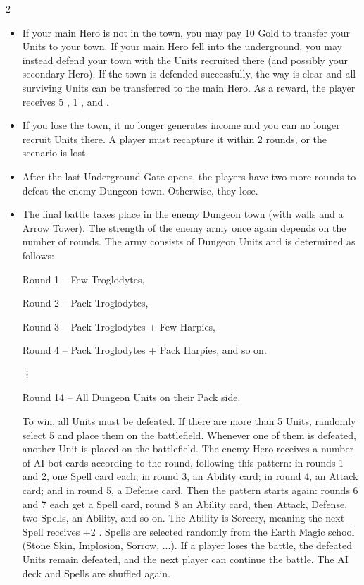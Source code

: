 \begin{multicols*}{2}
\begin{itemize}
\item If your main Hero is not in the town, you may pay 10 Gold to transfer your Units to your town. If your main Hero fell into the underground, you may instead defend your town with the Units recruited there (and possibly your secondary Hero). If the town is defended successfully, the way is clear and all surviving Units can be transferred to the main Hero. As a reward, the player receives 5 , 1 , and .
\item If you lose the town, it no longer generates income and you can no longer recruit Units there. A player must recapture it within 2 rounds, or the scenario is lost.
\item After the last Underground Gate opens, the players have two more rounds to defeat the enemy Dungeon town. Otherwise, they lose.
\item The final battle takes place in the enemy Dungeon town (with walls and a Arrow Tower). The strength of the enemy army once again depends on the number of rounds. The army consists of Dungeon Units and is determined as follows:

Round 1 -- Few  Troglodytes,

Round 2 -- Pack  Troglodytes,

Round 3 -- Pack  Troglodytes + Few  Harpies,

Round 4 -- Pack  Troglodytes + Pack  Harpies, and so on.

\hspace{1em}\vdots

Round 14 -- All Dungeon Units on their Pack side.

To win, all Units must be defeated. If there are more than 5 Units, randomly select 5 and place them on the battlefield. Whenever one of them is defeated, another Unit is placed on the battlefield. The enemy Hero receives a number of AI bot cards according to the round, following this pattern: in rounds 1 and 2, one Spell card each; in round 3, an Ability card; in round 4, an Attack card; and in round 5, a Defense card. Then the pattern starts again: rounds 6 and 7 each get a Spell card, round 8 an Ability card, then Attack, Defense, two Spells, an Ability, and so on. The Ability is Sorcery, meaning the next Spell receives +2 . Spells are selected randomly from the Earth Magic school (Stone Skin, Implosion, Sorrow, ...). If a player loses the battle, the defeated Units remain defeated, and the next player can continue the battle. The AI deck and Spells are shuffled again.
\end{itemize}
\end{multicols*}
